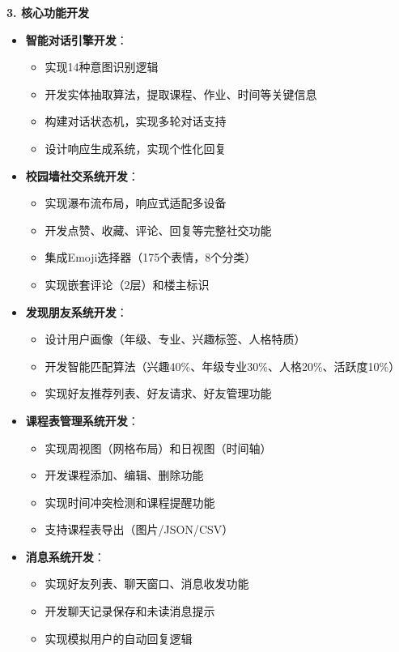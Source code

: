 \documentclass[12pt,a4paper]{article}
\begin{document}
\textbf{3. 核心功能开发}
\begin{itemize}
    \item \textbf{智能对话引擎开发}：
        \begin{itemize}
            \item 实现14种意图识别逻辑
            \item 开发实体抽取算法，提取课程、作业、时间等关键信息
            \item 构建对话状态机，实现多轮对话支持
            \item 设计响应生成系统，实现个性化回复
        \end{itemize}
    \item \textbf{校园墙社交系统开发}：
        \begin{itemize}
            \item 实现瀑布流布局，响应式适配多设备
            \item 开发点赞、收藏、评论、回复等完整社交功能
            \item 集成Emoji选择器（175个表情，8个分类）
            \item 实现嵌套评论（2层）和楼主标识
        \end{itemize}
    \item \textbf{发现朋友系统开发}：
        \begin{itemize}
            \item 设计用户画像（年级、专业、兴趣标签、人格特质）
            \item 开发智能匹配算法（兴趣40\%、年级专业30\%、人格20\%、活跃度10\%）
            \item 实现好友推荐列表、好友请求、好友管理功能
        \end{itemize}
    \item \textbf{课程表管理系统开发}：
        \begin{itemize}
            \item 实现周视图（网格布局）和日视图（时间轴）
            \item 开发课程添加、编辑、删除功能
            \item 实现时间冲突检测和课程提醒功能
            \item 支持课程表导出（图片/JSON/CSV）
        \end{itemize}
    \item \textbf{消息系统开发}：
        \begin{itemize}
            \item 实现好友列表、聊天窗口、消息收发功能
            \item 开发聊天记录保存和未读消息提示
            \item 实现模拟用户的自动回复逻辑
        \end{itemize}
\end{itemize}
\end{document}
